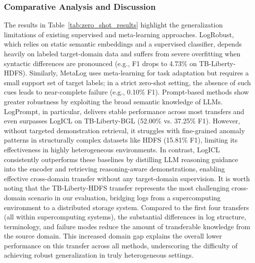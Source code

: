 \documentclass[lettersize,journal]{IEEEtran}
\begin{document}
\subsubsection{Comparative Analysis and Discussion}
The results in Table~\ref{tab:zero_shot_results} highlight the generalization limitations of existing supervised and meta-learning approaches. LogRobust, which relies on static semantic embeddings and a supervised classifier, depends heavily on labeled target-domain data and suffers from severe overfitting when syntactic differences are pronounced (e.g., F1 drops to 4.73\% on TB-Liberty-HDFS). Similarly, MetaLog uses meta-learning for task adaptation but requires a small support set of target labels; in a strict zero-shot setting, the absence of such cues leads to near-complete failure (e.g., 0.10\% F1).
Prompt-based methods show greater robustness by exploiting the broad semantic knowledge of LLMs. LogPrompt, in particular, delivers stable performance across most transfers and even surpasses LogICL on TB-Liberty-BGL (52.00\% vs. 37.25\% F1). However, without targeted demonstration retrieval, it struggles with fine-grained anomaly patterns in structurally complex datasets like HDFS (15.81\% F1), limiting its effectiveness in highly heterogeneous environments.
In contrast, LogICL consistently outperforms these baselines by distilling LLM reasoning guidance into the encoder and retrieving reasoning-aware demonstrations, enabling effective cross-domain transfer without any target-domain supervision.
It is worth noting that the TB-Liberty-HDFS transfer represents the most challenging cross-domain scenario in our evaluation, bridging logs from a supercomputing environment to a distributed storage system. Compared to the first four transfers (all within supercomputing systems), the substantial differences in log structure, terminology, and failure modes reduce the amount of transferable knowledge from the source domain. This increased domain gap explains the overall lower performance on this transfer across all methods, underscoring the difficulty of achieving robust generalization in truly heterogeneous settings.

\end{document}
